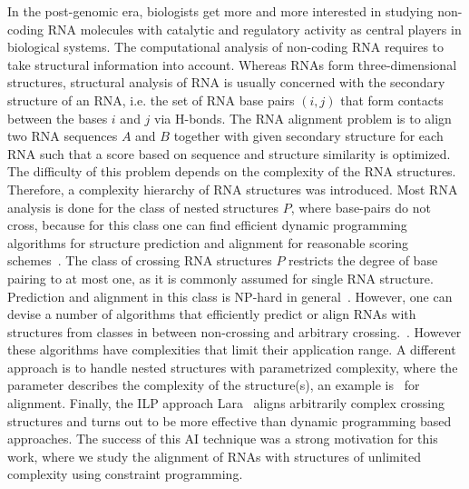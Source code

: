 \documentclass[11pt]{llncs}
\begin{document}
In the post-genomic era, biologists get more and more interested in
studying non-coding RNA molecules with catalytic and regulatory
activity as central players in biological systems. 
%
The computational analysis of non-coding RNA requires to take
structural information into account.
%
Whereas RNAs form three-dimensional structures, structural analysis of
RNA is usually concerned with the secondary structure of an RNA, i.e.
the set of RNA base pairs $(i,j)$ that form contacts between the bases
$i$ and $j$ via H-bonds. The RNA alignment problem is to align two RNA
sequences $A$ and $B$ together with given secondary structure for each
RNA such that a score based on sequence and structure similarity is
optimized. The difficulty of this problem depends on the complexity of
the RNA structures. Therefore, a complexity hierarchy of RNA
structures was introduced. Most RNA analysis is done for the class of
nested structures $P$, where base-pairs do not cross, because for this
class one can find efficient dynamic programming algorithms for
structure prediction and alignment for reasonable scoring
schemes~\cite{Zuker:Stiegler:Optim_compu_foldi:NAR1981,Jiang:Lin:Ma:Gener_Edit_Dista:JCB2002}. The
class of crossing RNA structures $P$ restricts the degree of base
pairing to at most one, as it is commonly assumed for single RNA
structure. Prediction and alignment in this class is NP-hard in
general~\cite{blin07:_exten_hardn_rna_secon_struc_compar}. However,
one can devise a number of algorithms that efficiently predict or
align RNAs with structures from classes in between non-crossing and
arbitrary
crossing.~\cite{Rivas:Eddy:dynam_progr_algor:JMB1999,Reeder:Giegerich:Desig_imple_and:2004,Moehl:Will:Backofen:PKalign:JCB2010}. However
these algorithms have complexities that limit their application
range. A different approach is to handle nested structures with
parametrized complexity, where the parameter describes the complexity
of the structure(s), an example is~\cite{Moehl:Will:Backofen:CPM2008} for alignment.
Finally, the ILP approach Lara~\cite{Bauer:Klau:Reinert:Accur_multi_seque:2007} aligns arbitrarily complex
crossing structures and turns out to be more effective than dynamic
programming based approaches. The success of this AI technique was a
strong motivation for this work, where we study the alignment of RNAs
with structures of unlimited complexity using constraint programming.
\end{document}
